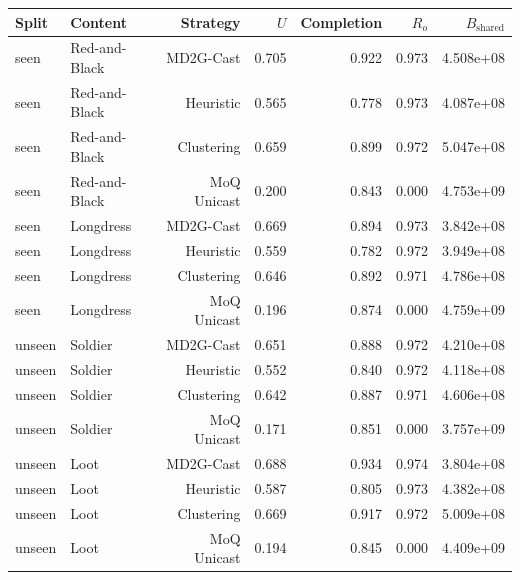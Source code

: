 \begin{tabular}{llrrrrr}
\hline
Split & Content & Strategy & $U$ & Completion & $R_o$ & $B_{\mathrm{shared}}$ \\
\hline
seen & Red-and-Black & MD2G-Cast & 0.705 & 0.922 & 0.973 & 4.508e+08 \\
seen & Red-and-Black & Heuristic & 0.565 & 0.778 & 0.973 & 4.087e+08 \\
seen & Red-and-Black & Clustering & 0.659 & 0.899 & 0.972 & 5.047e+08 \\
seen & Red-and-Black & MoQ Unicast & 0.200 & 0.843 & 0.000 & 4.753e+09 \\
seen & Longdress & MD2G-Cast & 0.669 & 0.894 & 0.973 & 3.842e+08 \\
seen & Longdress & Heuristic & 0.559 & 0.782 & 0.972 & 3.949e+08 \\
seen & Longdress & Clustering & 0.646 & 0.892 & 0.971 & 4.786e+08 \\
seen & Longdress & MoQ Unicast & 0.196 & 0.874 & 0.000 & 4.759e+09 \\
unseen & Soldier & MD2G-Cast & 0.651 & 0.888 & 0.972 & 4.210e+08 \\
unseen & Soldier & Heuristic & 0.552 & 0.840 & 0.972 & 4.118e+08 \\
unseen & Soldier & Clustering & 0.642 & 0.887 & 0.971 & 4.606e+08 \\
unseen & Soldier & MoQ Unicast & 0.171 & 0.851 & 0.000 & 3.757e+09 \\
unseen & Loot & MD2G-Cast & 0.688 & 0.934 & 0.974 & 3.804e+08 \\
unseen & Loot & Heuristic & 0.587 & 0.805 & 0.973 & 4.382e+08 \\
unseen & Loot & Clustering & 0.669 & 0.917 & 0.972 & 5.009e+08 \\
unseen & Loot & MoQ Unicast & 0.194 & 0.845 & 0.000 & 4.409e+09 \\
\hline
\end{tabular}
